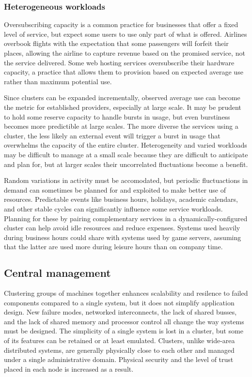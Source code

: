 \subsubsection{Heterogeneous workloads}

Oversubscribing capacity is a common practice for businesses that offer a fixed level of service, but expect some users to use only part of what is offered. Airlines overbook flights with the expectation that some passengers will forfeit their places, allowing the airline to capture revenue based on the promised service, not the service delivered. Some web hosting services oversubscribe their hardware capacity, a practice that allows them to provision based on expected average use rather than maximum potential use.

Since clusters can be expanded incrementally, observed average use can become the metric for established providers, especially at large scale. It may be prudent to hold some reserve capacity to handle bursts in usage, but even burstiness becomes more predictible at large scales. The more diverse the services using a cluster, the less likely an external event will trigger a burst in usage that overwhelms the capacity of the entire cluster. Heterogeneity and varied workloads may be difficult to manage at a small scale because they are difficult to anticipate and plan for, but at larger scales their uncorrelated fluctuations become a benefit.

Random variations in activity must be accomodated, but periodic fluctuactions in demand can sometimes be planned for and exploited to make better use of resources. Predictable events like business hours, holidays, academic calendars, and other stable cycles can significantly influence some service workloads. Planning for these by pairing complementary services in a dynamically-configured cluster can help avoid idle resources and reduce expenses. Systems used heavily during business hours could share with systems used by game servers, assuming that the latter are used more during leisure hours than on company time.

\subsection{Central management}

Clustering groups of machines together enhances scalability and resilence to failed components compared to a single system, but it does not simplify application design. New failure modes, networked interconnects, the lack of shared busses, and the lack of shared memory and processor control all change the way systems must be designed. The simplicity of a single system is lost in a cluster, but some of its features can be retained or at least emulated. Clusters, unlike wide-area distributed systems, are generally physically close to each other and managed under a single administrative domain. Physical security and the level of trust placed in each node is increased as a result.

